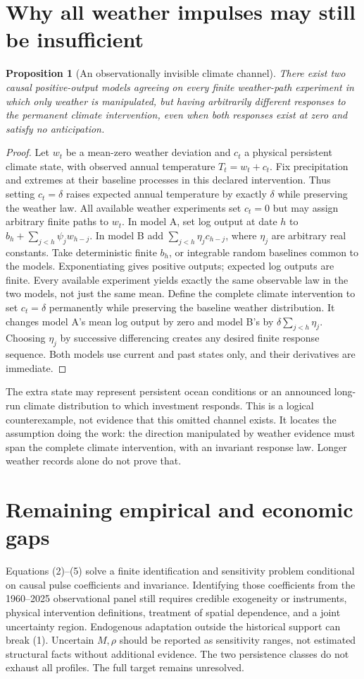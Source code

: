 \documentclass[11pt]{article}
\newtheorem{proposition}[theorem]{Proposition}
\begin{document}
\section{Why all weather impulses may still be insufficient}
\begin{proposition}[An observationally invisible climate channel]\label{invariance}
There exist two causal positive-output models agreeing on every finite
weather-path experiment in which only weather is manipulated, but having
arbitrarily different responses to the permanent climate intervention,
even when both responses exist at zero and satisfy no anticipation.
\end{proposition}
\begin{proof}
Let $w_t$ be a mean-zero weather deviation and $c_t$ a physical persistent
climate state, with observed annual temperature $T_t=w_t+c_t$. Fix
precipitation and extremes at their baseline processes in this declared
intervention. Thus setting $c_t=\delta$ raises expected annual temperature
by exactly $\delta$ while preserving the weather law. All available
weather experiments set $c_t=0$ but may assign arbitrary
finite paths to $w_t$. In model A, set log output at date $h$ to
$b_h+\sum_{j<h}\psi_j w_{h-j}$. In model B add
$\sum_{j<h}\eta_j c_{h-j}$, where $\eta_j$ are arbitrary real constants.
Take deterministic finite $b_h$, or integrable random baselines common to
the models. Exponentiating gives positive outputs; expected log outputs
are finite. Every available experiment yields exactly the same observable
law in the two models, not just the same mean. Define the complete climate
intervention to set $c_t=\delta$ permanently while preserving the baseline
weather distribution. It changes model A's mean log output by zero and
model B's by $\delta\sum_{j<h}\eta_j$. Choosing $\eta_j$ by successive
differencing creates any desired finite response sequence. Both models
use current and past states only, and their derivatives are immediate.
\end{proof}
The extra state may represent persistent ocean conditions or an announced
long-run climate distribution to which investment responds. This is a
logical counterexample, not evidence that this omitted channel exists.
It locates the assumption doing the work: the direction manipulated by
weather evidence must span the complete climate intervention, with an
invariant response law. Longer weather records alone do not prove that.

\section{Remaining empirical and economic gaps}
Equations (2)--(5) solve a finite identification and sensitivity problem
conditional on causal pulse coefficients and invariance. Identifying those
coefficients from the 1960--2025 observational panel still requires credible
exogeneity or instruments, physical intervention definitions, treatment of
spatial dependence, and a joint uncertainty region. Endogenous adaptation
outside the historical support can break (1). Uncertain $M,\rho$ should be
reported as sensitivity ranges, not estimated structural facts without
additional evidence. The two persistence classes do not exhaust all
profiles. The full target remains unresolved.
\end{document}
